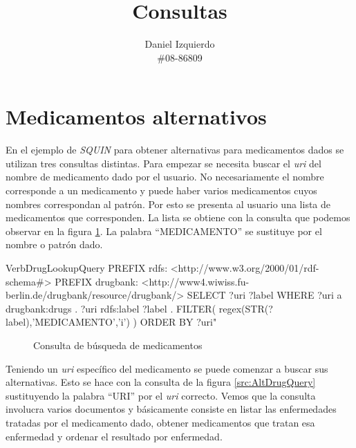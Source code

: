 \documentclass{article}
\begin{document}

\title{Consultas }
\date{}
\author{Daniel Izquierdo \\ \#08-86809}

\maketitle

\section{Medicamentos alternativos}

En el ejemplo de \emph{SQUIN} para obtener alternativas para medicamentos dados
se utilizan tres consultas distintas. Para empezar se necesita buscar el
\emph{uri} del nombre de medicamento dado por el usuario. No necesariamente el
nombre corresponde a un medicamento y puede haber varios medicamentos cuyos
nombres correspondan al patrón. Por esto se presenta al usuario una lista de
medicamentos que corresponden. La lista se obtiene con la consulta que podemos
observar en la figura \ref{src:DrugLookupQuery}. La palabra ``MEDICAMENTO'' se
sustituye por el nombre o patrón dado.

\begin{SaveVerbatim}{VerbDrugLookupQuery}
PREFIX rdfs: <http://www.w3.org/2000/01/rdf-schema#>
PREFIX drugbank: <http://www4.wiwiss.fu-berlin.de/drugbank/resource/drugbank/>
SELECT ?uri ?label WHERE {
  ?uri a drugbank:drugs .
  ?uri rdfs:label ?label .
  FILTER( regex(STR(?label),'MEDICAMENTO','i') )
}
ORDER BY ?uri"
\end{SaveVerbatim}

\begin{figure}[htbp]
 \fbox
 {
  \begin{minipage}{\textwidth}
   \caption{Consulta de búsqueda de medicamentos}
   \label{src:DrugLookupQuery}
  \end{minipage}
 }
\end{figure}

Teniendo un \emph{uri} específico del medicamento se puede comenzar a buscar sus
alternativas. Esto se hace con la consulta de la figura \ref{src:AltDrugQuery}
sustituyendo la palabra ``URI'' por el \emph{uri} correcto. Vemos que la
consulta involucra varios documentos y básicamente consiste en listar las
enfermedades tratadas por el medicamento dado, obtener medicamentos que tratan
esa enfermedad y ordenar el resultado por enfermedad.
\end{document}
